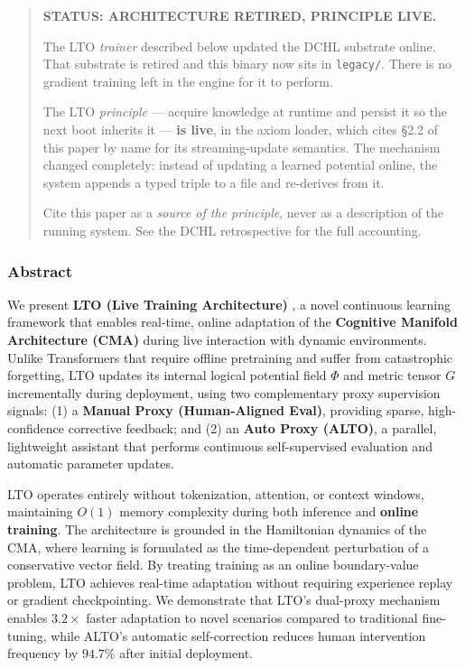 \documentclass[
  11pt,
  a4paper,
]{article}
\begin{document}
\begin{quote}
\textbf{STATUS: ARCHITECTURE RETIRED, PRINCIPLE LIVE.}

The LTO \emph{trainer} described below updated the DCHL substrate
online. That substrate is retired and this binary now sits in
\texttt{legacy/}. There is no gradient training left in the engine for
it to perform.

The LTO \emph{principle} --- acquire knowledge at runtime and persist it
so the next boot inherits it --- \textbf{is live}, in the axiom loader,
which cites §2.2 of this paper by name for its streaming-update
semantics. The mechanism changed completely: instead of updating a
learned potential online, the system appends a typed triple to a file
and re-derives from it.

Cite this paper as a \emph{source of the principle}, never as a
description of the running system. See the DCHL retrospective for the
full accounting.
\end{quote}

\subsubsection{Abstract}\label{abstract-3}

We present \textbf{LTO (Live Training Architecture)} , a novel
continuous learning framework that enables real-time, online adaptation
of the \textbf{Cognitive Manifold Architecture (CMA)} during live
interaction with dynamic environments. Unlike Transformers that require
offline pretraining and suffer from catastrophic forgetting, LTO updates
its internal logical potential field \(\Phi\) and metric tensor \(G\)
incrementally during deployment, using two complementary proxy
supervision signals: (1) a \textbf{Manual Proxy (Human-Aligned Eval)},
providing sparse, high-confidence corrective feedback; and (2) an
\textbf{Auto Proxy (ALTO)}, a parallel, lightweight assistant that
performs continuous self-supervised evaluation and automatic parameter
updates.

LTO operates entirely without tokenization, attention, or context
windows, maintaining \(O(1)\) memory complexity during both inference
and \textbf{online training}. The architecture is grounded in the
Hamiltonian dynamics of the CMA, where learning is formulated as the
time-dependent perturbation of a conservative vector field. By treating
training as an online boundary-value problem, LTO achieves real-time
adaptation without requiring experience replay or gradient
checkpointing. We demonstrate that LTO's dual-proxy mechanism enables
\(3.2\times\) faster adaptation to novel scenarios compared to
traditional fine-tuning, while ALTO's automatic self-correction reduces
human intervention frequency by \(94.7\%\) after initial deployment.
\end{document}
